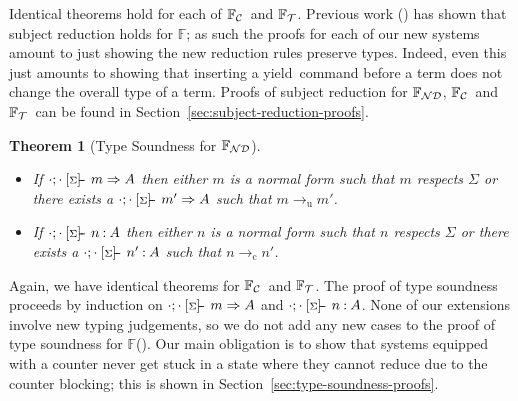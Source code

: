 \documentclass[msc,deptreport,cs]{infthesis} %
\newtheorem{theorem}{Theorem}
\newcommand\nondetfrank{$\mathbb{F}_{\cal{ND}}$}
\newcommand\countingfrank{$\mathbb{F}_{\cal{C}}$}
\newcommand\treefrank{$\mathbb{F}_{\cal{T}}$}
\newcommand\purefrank{$\mathbb{F}$}
\newcommand\yield{\textsf{yield}\xspace}
\newcommand{\todo}[1]
           {{\par\noindent\small\color{RoyalPurple}
  \framebox{\parbox{\dimexpr\linewidth-2\fboxsep-2\fboxrule}
    {\textbf{TODO:} #1}}}}
\newcommand{\sigentails}[1]{\mathbin{[{\text{\scriptsize ${#1}$}}]\hspace{-0.4ex}\text{-\!-}}\,}
\newcommand{\inferbase}[5]{#1; #3 \mathbin{#2} {#4} \Rightarrow {#5}}
\newcommand{\checkbase}[5]{#1; #3 \mathbin{#2} #5 \mathbin{:} #4}
\newcommand{\makes}[5]{\inferbase{#1}{\sigentails{#3}}{#2}{#4}{#5}}
\newcommand{\has}[5]{\checkbase{#1}{\sigentails{#3}}{#2}{#4}{#5}}
\newcommand{\infers}{\makes}
\newcommand{\checks}{\has}
\newcommand{\sigs}{\Sigma}
\newcommand{\nowt}{\emptyset}
\newcommand{\stepstou}{\longrightarrow_{\mathrm{u}}}
\newcommand{\stepstoc}{\longrightarrow_{\mathrm{c}}}
\begin{document}
Identical theorems hold for each of \countingfrank~and \treefrank. Previous work
(\cite{convent2020doo}) has shown that subject reduction holds for \purefrank;
as such the proofs for each of our new systems amount to just showing the new
reduction rules preserve types. Indeed, even this just amounts to showing that
inserting a \yield~command before a term does not change the overall type of a
term. Proofs of subject reduction for \nondetfrank, \countingfrank~and
\treefrank~can be found in Section~\ref{sec:subject-reduction-proofs}.




\begin{theorem}[Type Soundness for \nondetfrank]\label{thm:soundness}~
\begin{itemize}
\\
\item If $\infers{\cdot}{\cdot}{\sigs}{m}{A}$ then either $m$ is a normal form
  such that $m$ respects $\sigs$ or there exists a
  $\infers{\cdot}{\cdot}{\sigs}{m'}{A}$ such that $m \stepstou m'$.
\item If $\checks{\cdot}{\cdot}{\sigs}{A}{n}$ then either $n$ is a normal form
  such that $n$ respects $\sigs$ or there exists a
  $\checks{\cdot}{\cdot}{\sigs}{A}{n'}$ such that $n \stepstoc n'$.
\end{itemize}
\end{theorem}

Again, we have identical theorems for \countingfrank~and \treefrank. The proof
of type soundness proceeds by induction on $\infers{\cdot}{\cdot}{\sigs}{m}{A}$
and $\checks{\cdot}{\cdot}{\sigs}{A}{n}$. None of our extensions involve new
typing judgements, so we do not add any new cases to the proof of type soundness
for \purefrank(\cite{convent2020doo}). Our main obligation is to show that
systems equipped with a counter never get stuck in a state where they cannot
reduce due to the counter blocking; this is shown in
Section~\ref{sec:type-soundness-proofs}.


\end{document}

